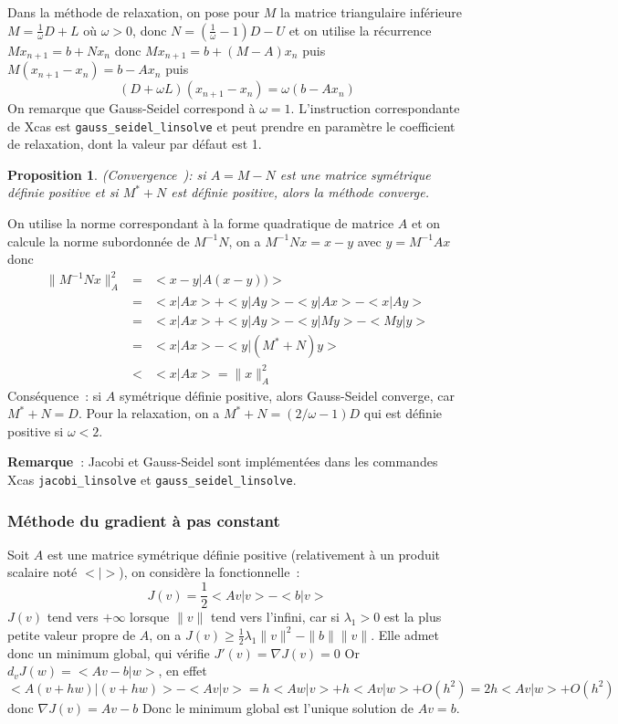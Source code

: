 \documentclass[a4paper,11pt]{article}
\newtheorem{prop}[thm]{Proposition}
\begin{document}
\begin{giacjshere}
Dans la m\'ethode de relaxation, on pose pour $M$ la matrice triangulaire
inf\'erieure $M=\frac1\omega D+L$ o\`u $\omega >0$, donc
$N=(\frac1\omega-1) D-U$
et on utilise la r\'ecurrence $Mx_{n+1}=b+Nx_n$ donc
$Mx_{n+1}=b+(M-A)x_n$ puis
$M(x_{n+1}-x_n)=b-Ax_n$ puis
$$ (D+\omega L) (x_{n+1}-x_n) = \omega(b-Ax_n)$$
On remarque que Gauss-Seidel correspond \`a $\omega=1$.
L'instruction correspondante de Xcas est \verb|gauss_seidel_linsolve| et
peut prendre en param\`etre le coefficient de relaxation, 
dont la valeur par d\'efaut est 1.

\begin{prop} (Convergence~): 
si $A=M-N$ est une matrice sym\'etrique d\'efinie positive
et si $M^*+N$ est d\'efinie positive, alors la m\'ethode converge. 
\end{prop}
On utilise la norme correspondant \`a
la forme quadratique de matrice $A$ et on calcule la norme subordonn\'ee
de $M^{-1}N$, on a $ M^{-1}Nx=x-y$ avec $y=M^{-1}Ax$ donc 
\begin{eqnarray*} 
\| M^{-1}Nx \|^2_A&=&<x-y|A (x-y))> \\
&=&<x|Ax>+<y|Ay>-<y|Ax>-<x|Ay> \\
&=&<x|Ax>+<y|Ay>-<y|My> -<My|y>\\
&=&<x|Ax>-<y|(M^*+N)y>\\
& < & <x|Ax>=\|x\|_A^2
\end{eqnarray*}
Cons\'equence~: si $A$ sym\'etrique d\'efinie positive, alors 
Gauss-Seidel converge, car $M^*+N=D$. Pour la relaxation,
on a $M^*+N=(2/\omega -1)D$ qui est d\'efinie positive si $\omega<2$.

{\bf Remarque~}: Jacobi et Gauss-Seidel sont impl\'ement\'ees dans les commandes
Xcas {\tt jacobi\_linsolve} et {\tt gauss\_seidel\_linsolve}.

\subsubsection{M\'ethode du gradient \`a pas constant}
Soit $A$ est une matrice sym\'etrique d\'efinie positive (relativement
\`a un produit scalaire not\'e $<|>$), on
consid\`ere la fonctionnelle~:
$$ J(v)=\frac12 <Av|v>-<b|v>$$
$J(v)$ tend vers $+\infty$ lorsque $\|v\|$ tend vers l'infini, 
car si $\lambda_1>0$ est la plus petite valeur propre de $A$,
on a $J(v)\geq \frac12 \lambda_1 \|v\|^2-\|b\|\|v\|$.
Elle admet donc un minimum global, qui v\'erifie $J'(v)=\nabla J(v)=0$
Or $d_vJ(w)=<Av-b|w>$, en effet
$$<A(v+hw)|(v+hw)>-<Av|v>=h<Aw|v>+h<Av|w>+O(h^2)=2h<Av|w>+O(h^2)$$
donc $\nabla J (v)=Av-b$
Donc le minimum global est l'unique solution de $Av=b$.


\end{giacjshere}
\end{document}
